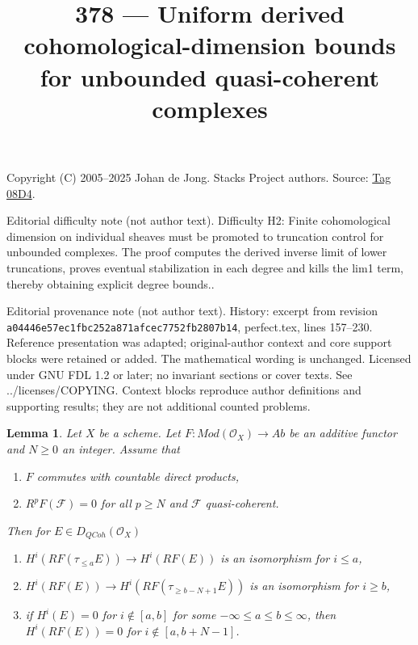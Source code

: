 \documentclass{amsart}
\theoremstyle{plain}
\newtheorem{lemma}[subsection]{Lemma}
\theoremstyle{definition}
\theoremstyle{remark}
\numberwithin{equation}{subsection}
\def\QCoh{\mathit{QCoh}}
\begin{document}
\title[Stacks Project, Tag 08D4]{378 --- Uniform derived cohomological-dimension bounds for unbounded quasi-coherent complexes}
\maketitle
\noindent Copyright (C) 2005--2025 Johan de Jong. Stacks Project authors. Source: \href{https://stacks.math.columbia.edu/tag/08D4}{Tag 08D4}.

\noindent Editorial difficulty note (not author text). Difficulty H2: Finite cohomological dimension on individual sheaves must be promoted to truncation control for unbounded complexes. The proof computes the derived inverse limit of lower truncations, proves eventual stabilization in each degree and kills the lim1 term, thereby obtaining explicit degree bounds..

\noindent Editorial provenance note (not author text). History: excerpt from revision \texttt{a0444\allowbreak 6e57e\allowbreak c1fbc\allowbreak 252a8\allowbreak 71afc\allowbreak ec775\allowbreak 2fb28\allowbreak 07b14}, perfect.tex, lines 157--230. Reference presentation was adapted; original-author context and core support blocks were retained or added. The mathematical wording is unchanged. Licensed under GNU FDL 1.2 or later; no invariant sections or cover texts. See ../licenses/COPYING. Context blocks reproduce author definitions and supporting results; they are not additional counted problems.

\begin{lemma}
\label{lemma-application-nice-K-injective}
Let $X$ be a scheme. Let $F : \textit{Mod}(\mathcal{O}_X) \to \textit{Ab}$
be an additive functor and $N \geq 0$ an integer. Assume that
\begin{enumerate}
\item $F$ commutes with countable direct products,
\item $R^pF(\mathcal{F}) = 0$ for all $p \geq N$ and $\mathcal{F}$
quasi-coherent.
\end{enumerate}
Then for $E \in D_\QCoh(\mathcal{O}_X)$
\begin{enumerate}
\item $H^i(RF(\tau_{\leq a}E)) \to H^i(RF(E))$ is an isomorphism
for $i \leq a$,
\item $H^i(RF(E)) \to H^i(RF(\tau_{\geq b - N + 1}E))$ is an isomorphism
for $i \geq b$,
\item if $H^i(E) = 0$ for $i \not \in [a, b]$ for some
$-\infty \leq a \leq b \leq \infty$, then $H^i(RF(E)) = 0$
for $i \not \in [a, b + N - 1]$.
\end{enumerate}
\end{lemma}
\end{document}
